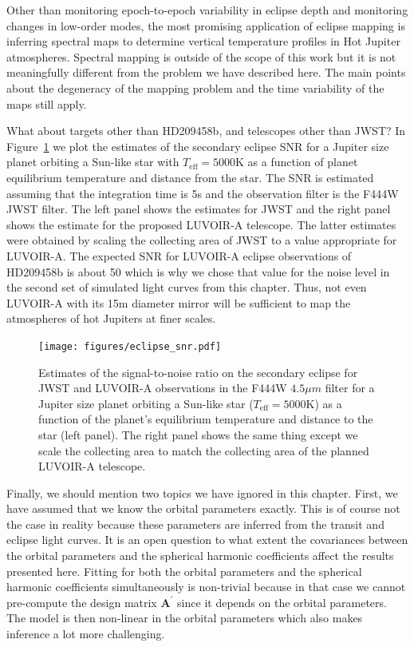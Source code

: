 \documentclass[12pt,dvipsnames]{report}
\renewcommand{\vec}[1]{\boldsymbol{\mathbf{#1}}}
\begin{document}
Other than monitoring epoch-to-epoch variability in eclipse depth and monitoring changes in low-order 
modes, the most promising application of eclipse mapping is inferring spectral maps to determine 
vertical temperature profiles in Hot Jupiter atmospheres. Spectral mapping is outside of the 
scope of this work but it is not meaningfully different from the problem we have described here. 
The main points about the degeneracy of the mapping problem and the time variability of the maps 
still apply. 

What about targets other than HD209458b, and telescopes other than JWST? In 
Figure~\ref{fig:eclipse_snr} we plot the estimates of the secondary eclipse SNR  for a Jupiter
size planet orbiting a Sun-like star with $T_\mathrm{eff}=5000$K as a function of planet equilibrium 
temperature and distance from the star. The SNR is estimated assuming that the integration 
time is 5s and the observation filter is the F444W JWST filter.
 The left panel shows the estimates for JWST and the right panel shows 
the estimate for the proposed LUVOIR-A telescope. 
The latter estimates were obtained by scaling the collecting area of JWST 
to a value appropriate for LUVOIR-A. The expected SNR for LUVOIR-A eclipse observations of 
HD209458b is about 50 which is why we chose that value for the noise level in the second set of
simulated light curves from this chapter. 
Thus, not even LUVOIR-A with its 15m diameter mirror will be sufficient
to map the atmospheres of hot Jupiters at finer scales.

\begin{figure}[t!]
    \begin{centering}
        \texttt{[image: figures/eclipse\_snr.pdf]}
        \caption{
            Estimates of the signal-to-noise ratio on the secondary eclipse for JWST and LUVOIR-A
            observations in the F444W $4.5\mu m$ filter for a Jupiter size planet
            orbiting a Sun-like star ($T_\mathrm{eff}=5000$K) as
            a function of the planet's equilibrium temperature and distance to the star (left panel).
            The right panel shows the same thing except we scale the collecting area to match 
            the collecting area of the planned LUVOIR-A telescope.
        }
        \label{fig:eclipse_snr}
    \end{centering}
\end{figure}

Finally, we should mention two topics we have ignored in this chapter. 
First, we have assumed that we 
know the orbital parameters exactly. This is of course not the case in reality because these 
parameters are inferred from the transit and eclipse light curves. It is an open question to what 
extent the covariances between the orbital parameters and the spherical harmonic coefficients
affect the results presented here. Fitting for both the orbital parameters and the spherical
harmonic coefficients simultaneously is non-trivial because in that case we cannot
pre-compute the design matrix $\vec A^\prime$ since it depends on the orbital parameters.
The model is then non-linear in the orbital parameters which also makes inference a lot more 
challenging. 
\end{document}

